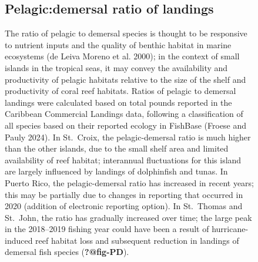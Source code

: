 \documentclass[
  letterpaper,
  oneside,
  open=any]{scrbook}
\begin{document}
\begin{figure}

\begin{minipage}{0.50\linewidth}

\subsection{Pelagic:demersal ratio of
landings}\label{pelagicdemersal-ratio-of-landings}

The ratio of pelagic to demersal species is thought to be responsive to
nutrient inputs and the quality of benthic habitat in marine ecosystems
(de Leiva Moreno et al. 2000); in the context of small islands in the
tropical seas, it may convey the availability and productivity of
pelagic habitats relative to the size of the shelf and productivity of
coral reef habitats. Ratios of pelagic to demersal landings were
calculated based on total pounds reported in the Caribbean Commercial
Landings data, following a classification of all species based on their
reported ecology in FishBase (Froese and Pauly 2024). In St.~Croix, the
pelagic-demersal ratio is much higher than the other islands, due to the
small shelf area and limited availability of reef habitat; interannual
fluctuations for this island are largely influenced by landings of
dolphinfish and tunas. In Puerto Rico, the pelagic-demersal ratio has
increased in recent years; this may be partially due to changes in
reporting that occurred in 2020 (addition of electronic reporting
option). In St.~Thomas and St.~John, the ratio has gradually increased
over time; the large peak in the 2018--2019 fishing year could have been
a result of hurricane-induced reef habitat loss and subsequent reduction
in landings of demersal fish species (\textbf{?@fig-PD}).\end{minipage}%
%
\begin{minipage}{0.50\linewidth}
\begin{center}

\end{center}
\end{minipage}
\end{figure}
\end{document}
